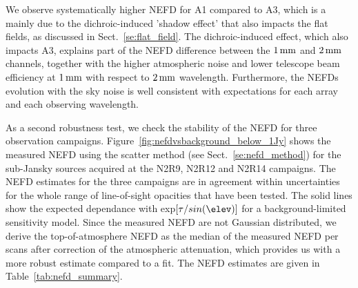 We observe systematically higher NEFD for A1 compared to
A3, which is a mainly due to the dichroic-induced 'shadow effect' that
also impacts the flat fields, as discussed in
Sect.~\ref{se:flat_field}.
The dichroic-induced effect, which also impacts
A3, explains part of the NEFD difference between the $1\, \rm{mm}$ and
$2\, \rm{mm}$ channels, together with the higher atmospheric noise and
lower telescope beam efficiency at $1\, \rm{mm}$ with respect to $2\,
\rm{mm}$ wavelength.   
Furthermore, the NEFDs evolution with the sky noise is well consistent
with expectations for each array and each observing
wavelength. 

As a second robustness test, we check the stability of the NEFD for
three observation campaigns. Figure~\ref{fig:nefdvsbackground_below_1Jy} shows the
measured NEFD using the scatter method (see Sect.~\ref{se:nefd_method}) for the
sub-Jansky sources acquired at the N2R9, N2R12 and N2R14
campaigns. The NEFD estimates for the
three campaigns are in agreement within uncertainties for the whole
range of line-of-sight opacities that have been tested.
The solid lines show the expected dependance with
exp${[\tau/sin(\elev)]}$ for a background-limited sensitivity
model. Since the measured NEFD are not Gaussian distributed, we
derive the top-of-atmosphere NEFD as the median of the measured NEFD
per scans after correction of the atmospheric attenuation, which provides us
with a more robust estimate compared to a fit. The NEFD estimates
are given in Table~\ref{tab:nefd_summary}.

